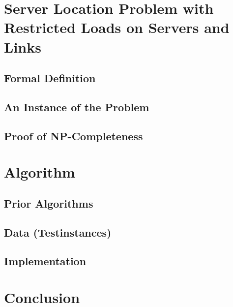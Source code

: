 \documentclass [12pt]{article}
\begin{document}
    \subsection {}
\section{Server Location Problem with Restricted Loads on Servers and Links}
\subsection{Formal Definition}
\subsection{An Instance of the Problem}
\subsection{Proof of NP-Completeness}
\section{Algorithm}
    \subsection{Prior Algorithms}
    \subsection{Data (Testinstances)}
    \subsection{Implementation}
\section{Conclusion}



\end{document}
